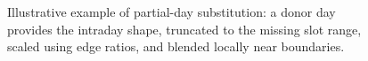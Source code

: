 \begin{figure}[h]
\caption{Illustrative example of partial-day substitution: a donor day provides the intraday shape, truncated to the missing slot range, scaled using edge ratios, and blended locally near boundaries.}
\end{figure}
